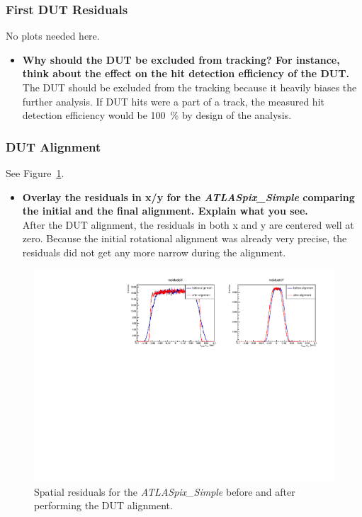 \documentclass[a4paper,11pt]{article}
\newcommand*{\apx}{\emph{ATLASpix\_Simple}\xspace}
\begin{document}
\clearpage
\subsubsection{First DUT Residuals}
No plots needed here.
\begin{itemize}
\item \textbf{Why should the DUT be excluded from tracking? For instance, think about the effect on the hit detection efficiency of the DUT.}\\
The DUT should be excluded from the tracking because it heavily biases the further analysis.
If DUT hits were a part of a track, the measured hit detection efficiency would be \SI{100}{\percent} by design of the analysis.
\end{itemize}

\subsubsection{DUT Alignment}
See Figure~\ref{fig:08_dut_alignment}.
\begin{itemize}
\item \textbf{Overlay the residuals in x/y for the \apx comparing the initial and the final alignment. Explain what you see.}\\
After the DUT alignment, the residuals in both x and y are centered well at zero.
Because the initial rotational alignment was already very precise, the residuals did not get any more narrow during the alignment.
\end{itemize}

\begin{figure}[!htb]
\centering
\includegraphics[width=\textwidth]{08_dut_alignment}
\caption{Spatial residuals for the \apx before and after performing the DUT alignment.}
\label{fig:08_dut_alignment}
\end{figure}
\end{document}
